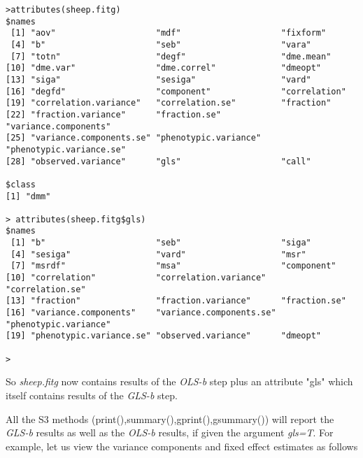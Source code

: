\documentclass[titlepage]{article}  %
\begin{document}
\begin{verbatim}
>attributes(sheep.fitg)
$names
 [1] "aov"                    "mdf"                    "fixform"               
 [4] "b"                      "seb"                    "vara"                  
 [7] "totn"                   "degf"                   "dme.mean"              
[10] "dme.var"                "dme.correl"             "dmeopt"                
[13] "siga"                   "sesiga"                 "vard"                  
[16] "degfd"                  "component"              "correlation"           
[19] "correlation.variance"   "correlation.se"         "fraction"              
[22] "fraction.variance"      "fraction.se"            "variance.components"   
[25] "variance.components.se" "phenotypic.variance"    "phenotypic.variance.se"
[28] "observed.variance"      "gls"                    "call"                  

$class
[1] "dmm"

> attributes(sheep.fitg$gls)
$names
 [1] "b"                      "seb"                    "siga"                  
 [4] "sesiga"                 "vard"                   "msr"                   
 [7] "msrdf"                  "msa"                    "component"             
[10] "correlation"            "correlation.variance"   "correlation.se"        
[13] "fraction"               "fraction.variance"      "fraction.se"           
[16] "variance.components"    "variance.components.se" "phenotypic.variance"   
[19] "phenotypic.variance.se" "observed.variance"      "dmeopt"                

> 
\end{verbatim}

 So {\em sheep.fitg} now contains results of the {\em OLS-b} step plus an attribute "gls" which itself contains results of the {\em GLS-b} step.

 All the S3 methods (print(),summary(),gprint(),gsummary()) will report the {\em GLS-b} results as well as the {\em OLS-b} results, if given the argument {\em gls=T}. For example, let us view the variance components and fixed effect estimates as follows
\end{document}

